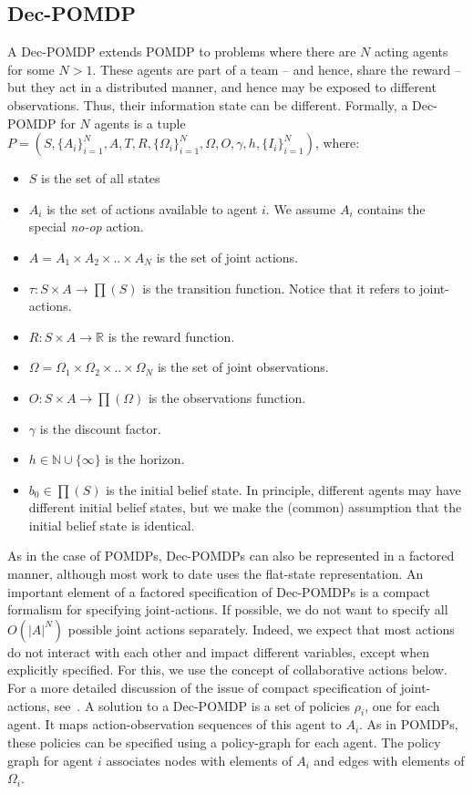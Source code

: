 \documentclass[letterpaper]{article} %
\begin{document}
\subsection{Dec-POMDP}
A Dec-POMDP extends POMDP to problems where there are $N$ acting agents for some $N>1$. 
These agents are part of a team -- and hence, share the reward -- but they act in a distributed manner,
and hence may be exposed to different observations. Thus, their information state can be different. 
Formally, a Dec-POMDP for $N$ agents is a tuple  $P=(S, {\{A_i\}}_{i=1}^{N}, A, T, R, {\{\Omega_i\}}_{i=1}^{N}, \Omega, O, \gamma, h, {\{I_i\}}_{i=1}^{N})$, where:
\begin{itemize}
\item
$S$ is the set of all states
\item
$A_i$ is the set of actions available to agent $i$. We assume $A_i$ contains the special {\em no-op} action.
\item
$A=A_1 \times A_2 \times .. \times A_N$ is the set of joint actions.
\item
$\tau:S \times A \rightarrow \prod(S)$  is the transition function. Notice that it refers to joint-actions.
\item
$R:S \times A \rightarrow \mathbb{R}$  is the reward function. 
\item
$\Omega = \Omega_1 \times \Omega_2 \times .. \times \Omega_N$ is the set of joint observations.
\item
$O:S \times A \rightarrow \prod(\Omega)$  is the observations function. 
\item
$\gamma$  is the discount factor.
\item
$h\in\mathbb{N}\cup\{\infty\}$ is the horizon.
\item
$b_0 \in \prod(S)$ is the initial belief state. In principle, different agents may have different initial belief states, but
we make the (common) assumption that the initial belief state is identical. 
\end{itemize}
As in the case of POMDPs, Dec-POMDPs can also be represented in a factored manner, although most work to date uses the flat-state representation.
An important element of a factored specification of Dec-POMDPs is a compact formalism for specifying joint-actions. If possible, we do not want
to specify all $O(|A|^N)$ possible joint actions separately. Indeed, we expect that most actions do not interact with each other and impact different
variables, except when explicitly specified. For this, we use the concept of collaborative actions below. For a more detailed discussion of the issue
of compact specification of joint-actions, see~\cite{}. 
A solution to a Dec-POMDP is a set of policies $\rho_i$, one for each agent. It maps action-observation sequences of this agent to $A_i$.
As in POMDPs, these policies can be specified using a policy-graph for each agent. The policy graph for agent $i$ associates nodes with elements of $A_i$
and edges with elements of $\Omega_i$. 
\end{document}
